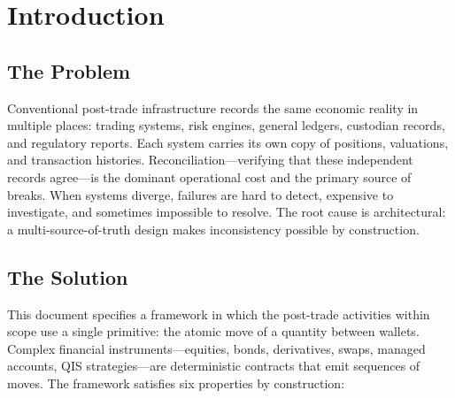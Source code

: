 \documentclass[11pt,a4paper]{article}
\begin{document}
\tableofcontents
\clearpage

\section{Introduction}
\label{sec:intro}

\subsection{The Problem}

Conventional post-trade infrastructure records the same economic reality in multiple places: trading systems, risk engines, general ledgers, custodian records, and regulatory reports. Each system carries its own copy of positions, valuations, and transaction histories. Reconciliation---verifying that these independent records agree---is the dominant operational cost and the primary source of breaks. When systems diverge, failures are hard to detect, expensive to investigate, and sometimes impossible to resolve. The root cause is architectural: a multi-source-of-truth design makes inconsistency possible by construction.

\subsection{The Solution}

This document specifies a framework in which the post-trade activities within scope use a single primitive: the atomic move of a quantity between wallets. Complex financial instruments---equities, bonds, derivatives, swaps, managed accounts, QIS strategies---are deterministic contracts that emit sequences of moves. The framework satisfies six properties by construction:
\end{document}
